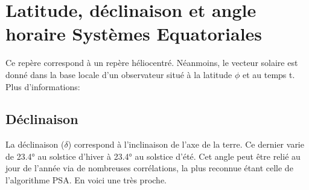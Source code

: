 \documentclass[letterpaper,10pt,english]{sphinxmanual}
\begin{document}
\section{Latitude, déclinaison et angle horaire \sphinxhyphen{} Systèmes Equatoriales}
\label{\detokenize{Part3/EmplacementSoleil:latitude-declinaison-et-angle-horaire-systemes-equatoriales}}
Ce repère correspond à un repère héliocentré. Néanmoins, le vecteur solaire est donné dans la base locale d’un observateur situé à la latitude \(\phi\) et au temps t. Plus d’informations: 



\subsection{Déclinaison}
\label{\detokenize{Part3/EmplacementSoleil:declinaison}}
La déclinaison (\(\delta\)) correspond à l’inclinaison de l’axe de la terre. Ce dernier varie de \sphinxhyphen{}23.4° au solstice d’hiver à 23.4° au solstice d’été. Cet angle peut être relié au jour de l’année via de nombreuses corrélations, la plus reconnue étant celle de l’algorithme PSA.
En voici une très proche.

\begin{sphinxVerbatim}[commandchars=\\\{\}]
   
       
   
   
    
   
\end{sphinxVerbatim}
\end{document}

